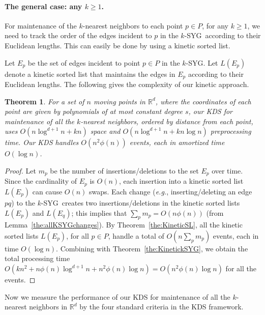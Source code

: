 \documentclass[preprint,12pt]{elsarticle}
\def\ksyg{\mbox{$k$-SYG}}
\newcommand{\eg}{\emph{e.g.}}
\newtheorem{theorem}{Theorem}[section]
\begin{document}
\paragraph{The general case: any $k\geq 1$.}\label{sec:KDSforkNNs}
For maintenance of the $k$-nearest neighbors to each point $p\in P$, for any $k\geq 1$, we need to track the order of the edges incident to $p$ in the \ksyg~according to their Euclidean lengths. This can easily be done by using a kinetic sorted list. 

Let $E_p$ be the set of edges incident to point $p\in P$ in the \ksyg. Let $L(E_p)$ denote a kinetic sorted list that maintains the edges in $E_p$ according to their Euclidean lengths. The following gives the complexity of our kinetic approach.

\begin{theorem}\label{the:KinetickNNs}
For a set of $n$ moving points in $\mathbb{R}^d$, where the coordinates of each point are given by polynomials of at most constant degree $s$, our KDS for maintenance of all the $k$-nearest neighbors, ordered by distance from each point, uses $O(n\log^{d+1} n +kn)$ space and $O(n\log^{d+1} n + kn\log n)$ preprocessing time. Our KDS handles $O(n^2\phi(n))$ events, each in  amortized time $O(\log n)$.
\end{theorem}
\begin{proof}
Let $m_p$ be the number of insertions/deletions to the set $E_p$ over time. Since the cardinality of $E_p$ is $O(n)$, each insertion into a kinetic sorted list $L(E_p)$ can cause $O(n)$ swaps. Each change (\eg, inserting/deleting an edge $pq$) to the \ksyg~creates two insertions/deletions in the kinetic sorted lists $L(E_p)$ and $L(E_q)$; this implies that $\sum_p m_p=O(n\phi(n))$ (from Lemma~\ref{the:allKSYGchanges}). By Theorem~\ref{the:KineticSL}, all the kinetic sorted lists $L(E_p)$, for all $p\in P$, handle a total of $O(n\sum_p m_p)$  events, each in time $O(\log n)$. Combining with Theorem~\ref{the:KinetickSYG}, we obtain the total processing time $O(kn^2 + n\phi(n)\log^{d+1}n + n^2\phi(n)\log n) = O(n^2\phi(n)\log n)$ for all the events.
\end{proof}

Now we measure the performance of our KDS for maintenance of all the $k$-nearest neighbors in $\mathbb{R}^d$ by the four standard criteria in the KDS framework.
\end{document}
